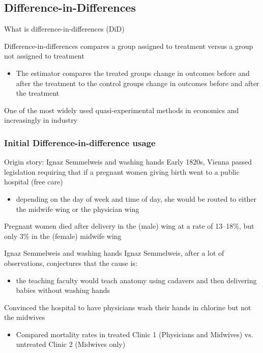 \documentclass[aspectratio=169,t,11pt,table]{beamer}
\begin{document}
\subsection{Difference-in-Differences}

\begin{frame}{What is difference-in-differences (DiD)}

  \alert{Difference-in-differences} compares a group assigned to treatment versus a group not assigned to treatment
  \begin{itemize}
    \item The estimator compares the treated groups change in outcomes before and after the treatment to the control groups change in outcomes before and after the treatment
  \end{itemize}

  \bigskip
  One of the most widely used quasi-experimental methods in economics and increasingly in industry

\end{frame}

\subsubsection{Initial Difference-in-difference usage}

\begin{frame}{Origin story: Ignaz Semmelweis and washing hands}
  Early 1820s, Vienna passed legislation requiring that if a pregnant
  women giving birth went to a public hospital (free care)
  \begin{itemize}
    \item depending on the day of week and time of day, she would be routed
    to either the midwife wing or the physician wing
  \end{itemize}
  
  \bigskip
  Pregnant women died after delivery in the (male) wing at a rate of 13--18\%, but only 3\% in the (female) midwife wing
\end{frame}

\begin{frame}{Ignaz Semmelweis and washing hands}
  Ignaz Semmelweis, after a lot of observations, conjectures that the cause is:
  \begin{itemize}
    \item the teaching faculty would teach anatomy using cadavers and then delivering babies without washing hands
  \end{itemize}

  \bigskip
  Convinced the hospital to have physicians wash their hands in chlorine but not the midwives
  \begin{itemize}
    \item Compared mortality rates in treated Clinic 1 (Physicians and Midwives) vs. untreated Clinic 2 (Midwives only)
  \end{itemize} 
\end{frame}
\end{document}
